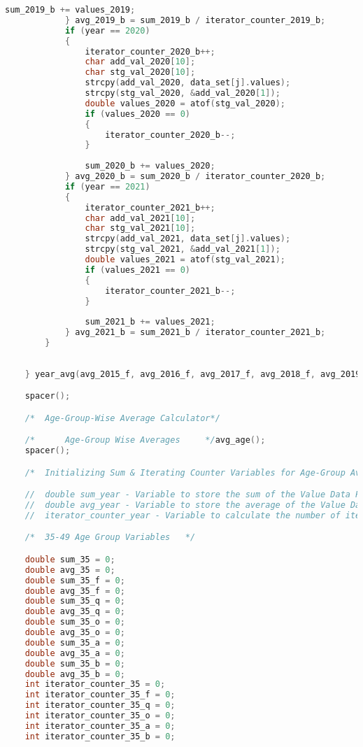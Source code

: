 \begin{lstlisting}[language=C, caption=\textit{CPS 188 Term Project Source Code}]
				sum_2019_b += values_2019;
			} avg_2019_b = sum_2019_b / iterator_counter_2019_b;
			if (year == 2020)
			{
				iterator_counter_2020_b++;
				char add_val_2020[10];
				char stg_val_2020[10];
				strcpy(add_val_2020, data_set[j].values);
				strcpy(stg_val_2020, &add_val_2020[1]);
				double values_2020 = atof(stg_val_2020);
				if (values_2020 == 0)
				{
					iterator_counter_2020_b--;
				}
				
				sum_2020_b += values_2020;
			} avg_2020_b = sum_2020_b / iterator_counter_2020_b;
			if (year == 2021)
			{
				iterator_counter_2021_b++;
				char add_val_2021[10];
				char stg_val_2021[10];
				strcpy(add_val_2021, data_set[j].values);
				strcpy(stg_val_2021, &add_val_2021[1]);
				double values_2021 = atof(stg_val_2021);
				if (values_2021 == 0)
				{
					iterator_counter_2021_b--;
				}
				
				sum_2021_b += values_2021;
			} avg_2021_b = sum_2021_b / iterator_counter_2021_b;
		}
		
		
    } year_avg(avg_2015_f, avg_2016_f, avg_2017_f, avg_2018_f, avg_2019_f, avg_2020_f, avg_2021_f, avg_2015_q, avg_2016_q, avg_2017_q, avg_2018_q, avg_2019_q, avg_2020_q, avg_2021_q, avg_2015_o, avg_2016_o, avg_2017_o, avg_2018_o, avg_2019_o, avg_2020_o, avg_2021_o, avg_2015_a, avg_2016_a, avg_2017_a, avg_2018_a, avg_2019_a, avg_2020_a, avg_2021_a, avg_2015_b, avg_2016_b, avg_2017_b, avg_2018_b, avg_2019_b, avg_2020_b, avg_2021_b);

	spacer();

    /*  Age-Group-Wise Average Calculator*/

	/*		Age-Group Wise Averages		*/avg_age();
	spacer();

	/*  Initializing Sum & Iterating Counter Variables for Age-Group Averages Calculation	*/

    //  double sum_year - Variable to store the sum of the Value Data Points subsequently in every iteration
	//	double avg_year - Variable to store the average of the Value Data Points subsequently after all iterations
    //  iterator_counter_year - Variable to calculate the number of iterations performed in the for loop

	/*	35-49 Age Group Variables	*/

    double sum_35 = 0;
	double avg_35 = 0;
	double sum_35_f = 0;
	double avg_35_f = 0;
	double sum_35_q = 0;
	double avg_35_q = 0;
	double sum_35_o = 0;
	double avg_35_o = 0;
	double sum_35_a = 0;
	double avg_35_a = 0;
	double sum_35_b = 0;
	double avg_35_b = 0;
	int iterator_counter_35 = 0;
	int iterator_counter_35_f = 0;
	int iterator_counter_35_q = 0;
	int iterator_counter_35_o = 0;
	int iterator_counter_35_a = 0;
	int iterator_counter_35_b = 0;


\end{lstlisting}
